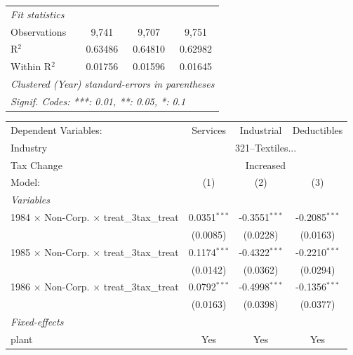 \documentclass[
  12pt]{article}
\theoremstyle{definition}
\theoremstyle{remark}
\begin{document}
\begin{table}
\begin{minipage}{\linewidth}
\begin{tabular}{lccc}
   \midrule
   \emph{Fit statistics}\\
   Observations                                            & 9,741          & 9,707           & 9,751\\  
   R$^2$                                                   & 0.63486        & 0.64810         & 0.62982\\  
   Within R$^2$                                            & 0.01756        & 0.01596         & 0.01645\\  
   \midrule \midrule
   \multicolumn{4}{l}{\emph{Clustered (Year) standard-errors in parentheses}}\\
   \multicolumn{4}{l}{\emph{Signif. Codes: ***: 0.01, **: 0.05, *: 0.1}}\\
\end{tabular}
\par\endgroup
\begingroup
\centering
\begin{tabular}{lccc}
   \tabularnewline \midrule \midrule
   Dependent Variables:                                    & Services       & Industrial      & Deductibles\\  
   Industry & \multicolumn{3}{c}{321–Textiles...} \\ 
   Tax Change & \multicolumn{3}{c}{Increased} \\ 
   Model:                                                  & (1)            & (2)             & (3)\\  
   \midrule
   \emph{Variables}\\
   1984 $\times$ Non-Corp. $\times$ treat\_3tax\_treat     & 0.0351$^{***}$ & -0.3551$^{***}$ & -0.2085$^{***}$\\   
                                                           & (0.0085)       & (0.0228)        & (0.0163)\\   
   1985 $\times$ Non-Corp. $\times$ treat\_3tax\_treat     & 0.1174$^{***}$ & -0.4322$^{***}$ & -0.2210$^{***}$\\   
                                                           & (0.0142)       & (0.0362)        & (0.0294)\\   
   1986 $\times$ Non-Corp. $\times$ treat\_3tax\_treat     & 0.0792$^{***}$ & -0.4998$^{***}$ & -0.1356$^{***}$\\   
                                                           & (0.0163)       & (0.0398)        & (0.0377)\\   
   \midrule
   \emph{Fixed-effects}\\
   plant                                                   & Yes            & Yes             & Yes\\  

\end{tabular}
\end{minipage}
\end{table}
\end{document}
